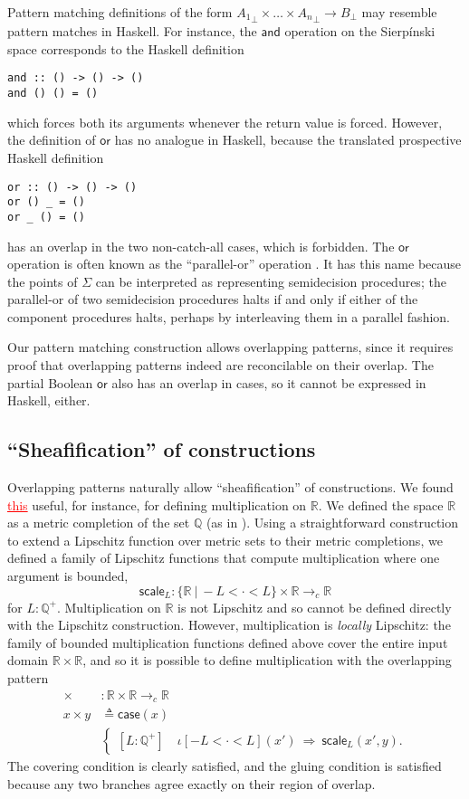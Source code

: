 \documentclass[conference]{IEEEtran}
\newcommand{\cto}{\to_c}
\newcommand{\R}{\mathbb{R}}
\newcommand{\rat}{\mathbb{Q}}
\newcommand{\suchthat}{\ |\ }
\newcommand{\oinclf}[1]{\iota[{#1}]}
\newcommand{\oincl}[2]{\oinclf{#1} \left({#2}\right)}
\newcommand{\Branch}{\Rightarrow}
\newcommand{\grammar}[1]{\textcolor{red}{\underline{#1}}}
\begin{document}
Pattern matching definitions of the form ${A_1}_\bot \times \ldots \times {A_n}_\bot \to B_\bot$ may resemble pattern matches in Haskell. For instance, the $\mathsf{and}$ operation on the Sierp\'inski space corresponds to the Haskell definition
\begin{Verbatim}[samepage=true]
and :: () -> () -> ()
and () () = ()
\end{Verbatim}
which forces both its arguments whenever the return value is forced. However, the definition of $\mathsf{or}$ has no analogue in Haskell, because the translated prospective Haskell definition
\begin{Verbatim}[samepage=true]
or :: () -> () -> ()
or () _ = ()
or _ () = ()
\end{Verbatim}
has an overlap in the two non-catch-all cases, which is forbidden.
The $\mathsf{or}$ operation is often known as the ``parallel-or'' operation \cite{escardo2004}. It has this name because the points of $\Sigma$ can be interpreted as representing semidecision procedures; the parallel-or of two semidecision procedures halts if and only if either of the component procedures halts, perhaps by interleaving them in a parallel fashion.

Our pattern matching construction allows overlapping patterns, since it requires proof that overlapping patterns indeed are reconcilable on their overlap. The partial Boolean $\mathsf{or}$ also has an overlap  in cases, so it cannot be expressed in Haskell, either.

\subsection{``Sheafification'' of constructions}
\label{s:ex:sheaf}

Overlapping patterns naturally allow ``sheafification'' of constructions. We found \grammar{this} useful, for instance, for defining multiplication on $\R$. We defined the space $\R$ as a metric completion of the set $\rat$ (as in \cite{vickersmetric}). Using a straightforward construction to extend a Lipschitz function over metric sets to their metric completions, we defined a family of Lipschitz functions that compute multiplication where one argument is bounded,
\[
\mathsf{scale}_L : \{ \R \suchthat -L < \cdot < L \} \times \R \cto \R
\]
for $L : \rat^+$. Multiplication on $\R$ is not Lipschitz and so cannot be defined directly with the Lipschitz construction. However, multiplication is \emph{locally} Lipschitz: the family of bounded multiplication functions defined above cover the entire input domain $\R \times \R$, and so it is possible to define multiplication with the overlapping pattern
\begin{align*}
\times &: \R \times \R \cto \R
\\ x \times y &\triangleq
\mathsf{case}(x)
\\
&\begin{cases}
[L : \rat^+] \quad \oincl{-L < \cdot < L}{x'}  \  \Branch \  \mathsf{scale}_L(x', y).
\end{cases}
\end{align*}
The covering condition is clearly satisfied, and the gluing condition is satisfied because any two branches agree exactly on their region of overlap.
\end{document}
